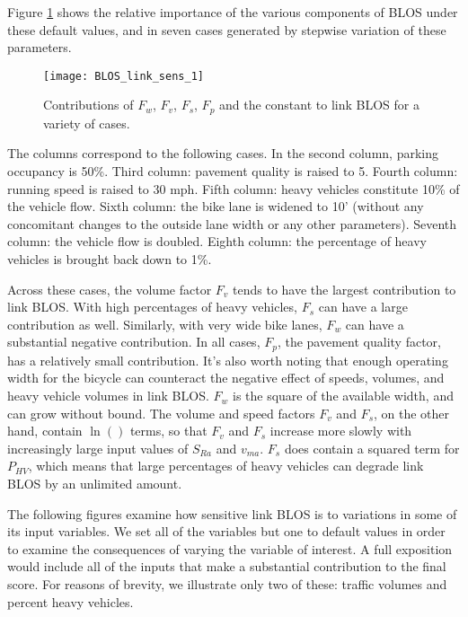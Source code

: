\documentclass[11pt]{article} %
\begin{document}
Figure \ref{fig:BLOS_link_sens_defaults} shows the relative importance of the various components of BLOS under these default values, and in seven cases generated by stepwise variation of these parameters. 

\vspace{12pt}

\begin{figure}[h]
\centering

\texttt{[image: BLOS\_link\_sens\_1]}


\caption{Contributions of $F_w$, $F_v$, $F_s$, $F_p$ and the constant to link BLOS for a variety of cases.}

\label{fig:BLOS_link_sens_defaults}

\end{figure}


\vspace{12pt}

The columns correspond to the following cases. In the second column, parking occupancy is 50\%. Third column: pavement quality is raised to 5. Fourth column: running speed is raised to 30 mph. Fifth column: heavy vehicles constitute 10\% of the vehicle flow. Sixth column: the bike lane is widened to 10' (without any concomitant changes to the outside lane width or any other parameters). Seventh column: the vehicle flow is doubled. Eighth column: the percentage of heavy vehicles is brought back down to 1\%.


Across these cases, the volume factor $F_v$ tends to have the largest contribution to link BLOS. With high percentages of heavy vehicles, $F_s$ can have a large contribution as well. Similarly, with very wide bike lanes, $F_w$ can have a substantial negative contribution. In all cases, $F_p$, the pavement quality factor, has a relatively small contribution. It's also worth noting that enough operating width for the bicycle can counteract the negative effect of speeds, volumes, and heavy vehicle volumes in link BLOS. $F_w$ is the square of the available width, and can grow without bound. The volume and speed factors $F_v$ and $F_s$, on the other hand, contain $\ln( )$ terms, so that $F_v$ and $F_s$ increase more slowly with increasingly large input values of $S_{Ra}$ and $v_{ma}$. $F_s$ does contain a squared term for $P_{HV}$, which means that large percentages of heavy vehicles can degrade link BLOS by an unlimited amount.

The following figures examine how sensitive link BLOS is to variations in some of its input variables. We set all of the variables but one to default values in order to examine the consequences of varying the variable of interest. A full exposition would include all of the inputs that make a substantial contribution to the final score. For reasons of brevity, we illustrate only two of these: traffic volumes and percent heavy vehicles.
\end{document}
